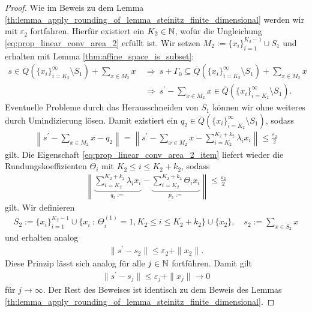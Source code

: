\begin{proof}
	Wie im Beweis zu dem Lemma \ref{th:lemma_apply_rounding_of_lemma_steinitz_finite_dimensional} werden wir mit $ \varepsilon_2 $ fortfahren.
	Hierfür existiert ein $ K_2 \in \mathbb{N} $, wofür die Ungleichung \eqref{eq:prop_linear_conv_area_2} erfüllt ist.
	Wir setzen $ M_2 := \{x_i\}_{i=1}^{K_2 - 1} \cup S_1$ und erhalten mit Lemma \ref{thm:affine_space_is_subset}:
	\begin{align*}
		s \in \overline{Q}(\{x_i\}_{i=K_2}^\infty \setminus S_1)  + \sum \limits_{ x  \in M_2} x
		\ &\Rightarrow \
		s + \Gamma_0 \subseteq \overline{Q}(\{x_i\}_{i=K_2}^\infty \setminus S_1)  + \sum \limits_{ x \in M_2} x\\
		\ &\Rightarrow \
		s^\prime - \sum\limits_{ x \in M_2} x \in \overline{Q}(\{x_i\}_{i=K_2}^\infty \setminus S_1).
	\end{align*}
	Eventuelle Probleme durch das Herausschneiden von $ S_1 $ können wir ohne weiteres durch Umindizierung lösen.
	Damit existiert ein $ q_2 \in  \overline{Q}(\{x_i\}_{i=K_2}^\infty \setminus S_1)$, sodass
	\begin{align*}
		\left\| s^\prime - 
		\sum\limits_{ x \in M_2} x - q_2
		\right\| 
		=
		\left\| s^\prime - 
		\sum\limits_{ x \in M_2} x - \sum \limits_{i = K_2}^{K_2+ k_2} \lambda_i x_{i}
		\right\| 
		\leq \frac{\varepsilon_2}{2}
	\end{align*}
	gilt. Die Eigenschaft \ref{eq:prop_linear_conv_area_2_item} liefert wieder die Rundungskoeffizienten $ \Theta_i $ mit $ K_2 \leq i \leq  K_2 + k_2 $, sodass 
	\begin{align*}
		\left\| 
		\underbrace{\sum \limits_{i = K_2}^{K_2+ k_2} \lambda_i x_{i}}_{q_2 := }
		- 
		\underbrace{\sum \limits_{i = K_2}^{K_2+ k_2}\Theta_i x_i }_{p_2 :=}
		\right\| 
		\leq \frac{\varepsilon_2}{2}
	\end{align*}
	gilt. Wir definieren
	\begin{align*}
		S_2 := \{x_i\}_{i =1}^{K_2 - 1} \cup \{x_i \ : \  \Theta_i^{(1)} = 1, K_2 \leq i \leq K_2 + k_2\} \cup \{x_2\}, \quad
		s_2 := \sum \limits_{x \in S_2} x
	\end{align*}
	und erhalten analog
	\begin{align*}
		\| s^\prime - s_2 \| \leq \varepsilon_2 + \|x_2 \|.
	\end{align*}
	Diese Prinzip lässt sich analog für alle $ j \in \mathbb{N} $ fortführen.
	Damit gilt
	\begin{align*}
		\|s^\prime - s_j \| \leq \varepsilon_j +  \|x_j\| \rightarrow 0
	\end{align*}
	für $ j \to \infty $. Der Rest des Beweises ist identisch zu dem Beweis des Lemmas \ref{th:lemma_apply_rounding_of_lemma_steinitz_finite_dimensional}.
%	 
	

\end{proof}
